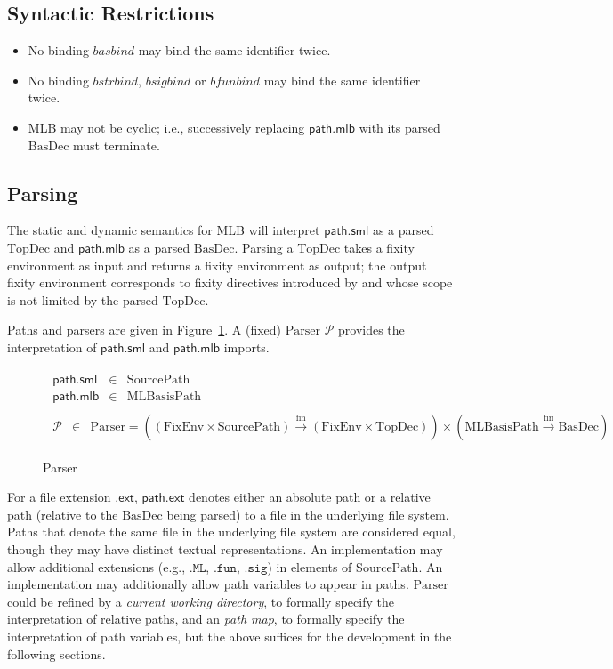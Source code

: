 \documentclass[draft]{article}
\renewcommand{\mit}[1]{\mathit{#1}}
\newcommand{\mrm}[1]{\mathrm{#1}}
\newcommand{\mtt}[1]{\mathtt{#1}}
\newcommand{\mcal}[1]{\mathcal{#1}}
\newcommand{\msf}[1]{\mathsf{#1}}
\begin{document}
\subsection{Syntactic Restrictions}
\begin{itemize}
\item No binding $\mit{basbind}$ may bind the same identifier twice.
\item No binding $\mit{bstrbind}$, $\mit{bsigbind}$ or $\mit{bfunbind}$ may bind the same identifier twice.
\item MLB may not be cyclic; i.e., successively replacing
  $\msf{path.mlb}$ with its parsed $\mrm{BasDec}$ must terminate.
\end{itemize}
%
\subsection{Parsing}
The static and dynamic semantics for MLB will interpret
$\msf{path.sml}$ as a parsed $\mrm{TopDec}$ and
$\msf{path.mlb}$ as a parsed $\mrm{BasDec}$.  Parsing a $\mrm{TopDec}$
takes a fixity environment as input and returns a fixity environment
as output; the output fixity environment corresponds to fixity
directives introduced by and whose scope is not limited by the parsed
$\mrm{TopDec}$.

Paths and parsers are given in Figure~\ref{fig:mlb:S:PathsParser}.  A
(fixed) $\mrm{Parser}$ $\mcal{P}$ provides the interpretation of
$\msf{path.sml}$ and $\msf{path.mlb}$ imports.
\begin{figure}[h]
\begin{displaymath}
\begin{array}{c}
\begin{array}{rcl}
\msf{path.sml} & \in & \mrm{SourcePath} \\
\msf{path.mlb} & \in & \mrm{MLBasisPath} 
\end{array} \\
\begin{array}{rcl}
\mcal{P} & \in & \mrm{Parser} = 
((\mrm{FixEnv} \times \mrm{SourcePath})
 \xrightarrow{\mrm{fin}} (\mrm{FixEnv} \times \mrm{TopDec})) 
\times 
(\mrm{MLBasisPath} \xrightarrow{\mrm{fin}} \mrm{BasDec}) 
\end{array}
\end{array}
\end{displaymath}
\caption{Parser}\label{fig:mlb:S:PathsParser}
\end{figure}
%
For a file extension $\msf{.ext}$, $\msf{path.ext}$ denotes either an
absolute path or a relative path (relative to the $\mrm{BasDec}$ being
parsed) to a file in the underlying file system.  Paths that denote the same
file in the underlying file system are considered equal, though they may
have distinct textual representations.  An implementation
may allow additional extensions (e.g., $\mtt{.ML}$, $\mtt{.fun}$,
$\mtt{.sig}$) in elements of $\mrm{SourcePath}$.  An implementation
may additionally allow path variables to appear in
paths.  $\mrm{Parser}$ could be refined by a \emph{current working
directory}, to formally specify the interpretation of relative paths,
and an \emph{path map}, to formally specify the
interpretation of path variables, but the above suffices
for the development in the following sections.
%
\end{document}
